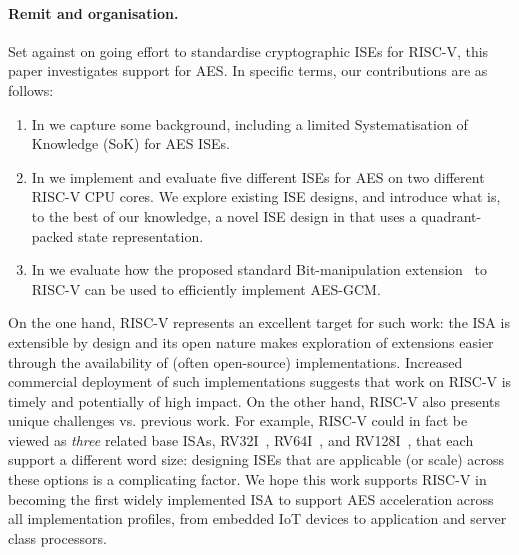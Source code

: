 
\paragraph{Remit and organisation.}

Set against on going effort to standardise cryptographic ISEs for RISC-V,
this paper investigates support for AES.
In specific terms, our contributions are as follows:

\begin{enumerate}

\item In 
      we capture some background, including a limited
      Systematisation of Knowledge (SoK)
      for AES ISEs.

\item In 
      we implement and evaluate five different ISEs for AES on two different 
      RISC-V CPU cores.
      We explore existing ISE designs, 
      and introduce what is, to the best of our knowledge, a novel ISE design
      in  
      that uses a quadrant-packed state representation.

\item In
      we evaluate how the
      proposed standard 
      Bit-manipulation
      extension~\cite[Section 21]{RV:ISA:I:19}
      to RISC-V can be used to efficiently implement AES-GCM.

\end{enumerate}

\noindent
On the one hand, 
RISC-V represents an excellent target for such work:
the ISA is extensible by design and its open nature makes
exploration of extensions easier through the availability of
(often open-source) implementations.  
Increased commercial deployment of such implementations suggests that work 
on RISC-V is timely and potentially of high impact.
On the other hand, RISC-V also presents unique challenges vs. previous work.
For example,
RISC-V could in fact be viewed as {\em three} related base ISAs,
 RV32I~\cite[Section 2]{RV:ISA:I:19},
 RV64I~\cite[Section 5]{RV:ISA:I:19},
and
RV128I~\cite[Section 6]{RV:ISA:I:19},
that each support a different word size:
designing ISEs that are applicable (or scale) across these options is a
complicating factor.
We hope this work supports RISC-V in becoming the
first widely implemented ISA to support AES acceleration across
all implementation profiles, from embedded IoT devices to application
and server class processors.

%

